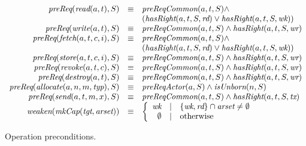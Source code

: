 \begin{figure}
  \[
  \begin{array}{rcl}
    \textit{preReq}(\textit{read}(a,t),S) & \equiv &  \textit{preReqCommon}(a,t,S) \wedge \\
    & & (\textit{hasRight}(a,t,S,\textit{rd}) \vee \textit{hasRight}(a,t,S,\textit{wk})) \\
    \textit{preReq}(\textit{write}(a,t),S) & \equiv & \textit{preReqCommon}(a,t,S) \wedge \textit{hasRight}(a,t,S,\textit{wr}) \\
    \textit{preReq}(\textit{fetch}(a,t,c,i),S) & \equiv & \textit{preReqCommon}(a,t,S) \wedge \\
    & & (\textit{hasRight}(a,t,S,\textit{rd}) \vee \textit{hasRight}(a,t,S,\textit{wk})) \\
    \textit{preReq}(\textit{store}(a,t,c,i),S) & \equiv & \textit{preReqCommon}(a,t,S) \wedge \textit{hasRight}(a,t,S,\textit{wr}) \\
    \textit{preReq}(\textit{revoke}(a,t,c),S) & \equiv & \textit{preReqCommon}(a,t,S) \wedge \textit{hasRight}(a,t,S,\textit{wr}) \\
    \textit{preReq}(\textit{destroy}(a,t),S) & \equiv & \textit{preReqCommon}(a,t,S) \wedge \textit{hasRight}(a,t,S,\textit{wr}) \\
    \textit{preReq}(\textit{allocate}(a,n,m,\textit{typ}),S) & \equiv & \textit{preReqActor}(a,S) \wedge \textit{isUnborn}(n,S) \\
    \textit{preReq}(\textit{send}(a,t,m,x),S) & \equiv & \textit{preReqCommon}(a,t,S) \wedge \textit{hasRight}(a,t,S,\textit{tx}) \\
      \textit{weaken}(\textit{mkCap}(\textit{tgt},\textit{arset})) & \equiv & \left\{
      \begin{array}{rcl}
        \textit{wk} & | & \{\textit{wk}, \textit{rd}\} \cap \textit{arset} \neq \emptyset \\
        \emptyset & | & \text{otherwise}
      \end{array}
      \right.\\
  \end{array}
  \]
  \caption{Operation preconditions. \label{fig:sketch:preconditions}}
\end{figure}

